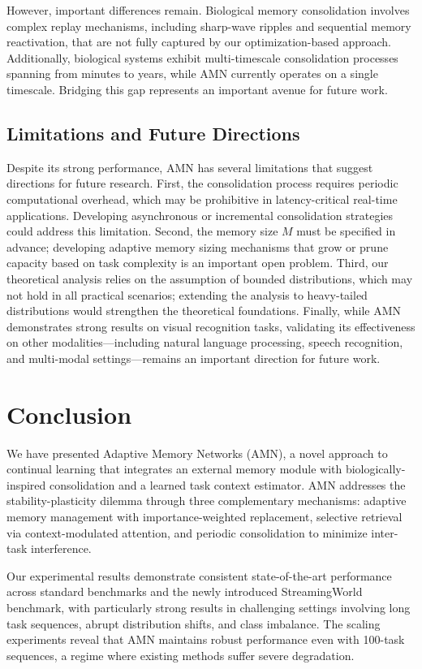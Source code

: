 \documentclass[11pt]{article}
\begin{document}
However, important differences remain. Biological memory consolidation involves complex replay mechanisms, including sharp-wave ripples and sequential memory reactivation, that are not fully captured by our optimization-based approach. Additionally, biological systems exhibit multi-timescale consolidation processes spanning from minutes to years, while AMN currently operates on a single timescale. Bridging this gap represents an important avenue for future work.

\subsection{Limitations and Future Directions}

Despite its strong performance, AMN has several limitations that suggest directions for future research. First, the consolidation process requires periodic computational overhead, which may be prohibitive in latency-critical real-time applications. Developing asynchronous or incremental consolidation strategies could address this limitation. Second, the memory size $M$ must be specified in advance; developing adaptive memory sizing mechanisms that grow or prune capacity based on task complexity is an important open problem. Third, our theoretical analysis relies on the assumption of bounded distributions, which may not hold in all practical scenarios; extending the analysis to heavy-tailed distributions would strengthen the theoretical foundations. Finally, while AMN demonstrates strong results on visual recognition tasks, validating its effectiveness on other modalities---including natural language processing, speech recognition, and multi-modal settings---remains an important direction for future work.

\section{Conclusion}
\label{sec:conclusion}

We have presented Adaptive Memory Networks (AMN), a novel approach to continual learning that integrates an external memory module with biologically-inspired consolidation and a learned task context estimator. AMN addresses the stability-plasticity dilemma through three complementary mechanisms: adaptive memory management with importance-weighted replacement, selective retrieval via context-modulated attention, and periodic consolidation to minimize inter-task interference.

Our experimental results demonstrate consistent state-of-the-art performance across standard benchmarks and the newly introduced StreamingWorld benchmark, with particularly strong results in challenging settings involving long task sequences, abrupt distribution shifts, and class imbalance. The scaling experiments reveal that AMN maintains robust performance even with 100-task sequences, a regime where existing methods suffer severe degradation.
\end{document}
